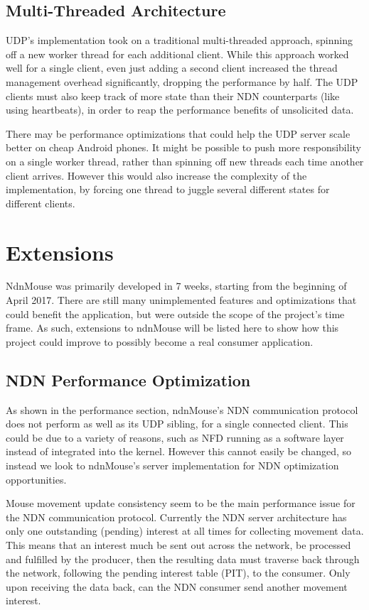 \documentclass{sig-alternate}
\renewcommand\_{\textunderscore\allowbreak}  %
\begin{document}
\subsection{Multi-Threaded Architecture}
UDP's implementation took on a traditional multi-threaded approach, spinning off a new worker thread for each additional client. While this approach worked well for a single client, even just adding a second client increased the thread management overhead significantly, dropping the performance by half. The UDP clients must also keep track of more state than their NDN counterparts (like using heartbeats), in order to reap the performance benefits of unsolicited data.

There may be performance optimizations that could help the UDP server scale better on cheap Android phones. It might be possible to push more responsibility on a single worker thread, rather than spinning off new threads each time another client arrives. However this would also increase the complexity of the implementation, by forcing one thread to juggle several different states for different clients.

\section{Extensions}
NdnMouse was primarily developed in 7 weeks, starting from the beginning of April 2017. There are still many unimplemented features and optimizations that could benefit the application, but were outside the scope of the project's time frame. As such, extensions to ndnMouse will be listed here to show how this project could improve to possibly become a real consumer application.

\subsection{NDN Performance Optimization}
As shown in the performance section, ndnMouse's NDN communication protocol does not perform as well as its UDP sibling, for a single connected client. This could be due to a variety of reasons, such as NFD running as a software layer instead of integrated into the kernel. However this cannot easily be changed, so instead we look to ndnMouse's server implementation for NDN optimization opportunities.

Mouse movement update consistency seem to be the main performance issue for the NDN communication protocol. Currently the NDN server architecture has only one outstanding (pending) interest at all times for collecting movement data. This means that an interest much be sent out across the network, be processed and fulfilled by the producer, then the resulting data must traverse back through the network, following the pending interest table (PIT), to the consumer. Only upon receiving the data back, can the NDN consumer send another movement interest.
\end{document}
